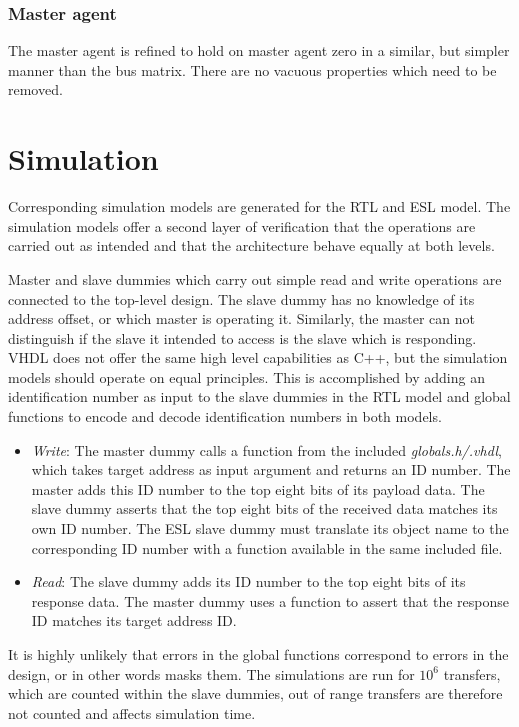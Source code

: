 \subsubsection{Master agent}
The master agent is refined to hold on master agent zero in a similar, but simpler manner than the bus matrix. There are no vacuous properties which need to be removed. 



\section{Simulation}
\label{sec:sim}
Corresponding simulation models are generated for the RTL and ESL model. The simulation models offer a second layer of verification that the operations are carried out as intended and that the architecture behave equally at both levels. \par
Master and slave dummies which carry out simple read and write operations are connected to the top-level design. The slave dummy has no knowledge of its address offset, or which master is operating it. Similarly, the master can not distinguish if the slave it intended to access is the slave which is responding. VHDL does not offer the same high level capabilities as C++, but the simulation models should operate on equal principles. This is accomplished by adding an identification number as input to the slave dummies in the RTL model and global functions to encode and decode identification numbers in both models. 

\begin{itemize}
 \item \textit{Write}: The master dummy calls a function from the included \textit{globals.h/.vhdl}, which takes target address as input argument and returns an ID number. The master adds this ID number to the top eight bits of its payload data. The slave dummy asserts that the top eight bits of the received data matches its own ID number. The ESL slave dummy must translate its object name to the corresponding ID number with a function available in the same included file. 
 \item \textit{Read}: The slave dummy adds its ID number to the top eight bits of its response data. The master dummy uses a function to assert that the response ID matches its target address ID.   
\end{itemize}  

It is highly unlikely that errors in the global functions correspond to errors in the design, or in other words masks them.  The simulations are run for $10^6$ transfers, which are counted within the slave dummies, out of range transfers are therefore not counted and affects simulation time.  


